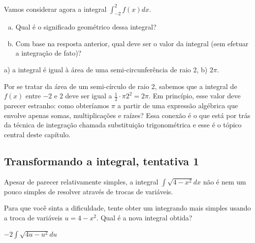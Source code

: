 \documentclass[main_estudante.tex]{subfiles}
\begin{document}

\begin{questao}
Vamos considerar agora a integral $\int_{-2}^{2} f(x)dx$.
\begin{enumerate}[a)]
\item Qual é o significado geométrico dessa integral?
\item Com base na resposta anterior, qual deve ser o valor da integral (sem efetuar a integração de fato)?
\end{enumerate}
\end{questao}

\begin{gabarito}
	\begin{gabaritoQuestao}
		a) a integral é igual à área de uma semi-circunferência de raio 2, b) $2\pi$.
	\end{gabaritoQuestao}
\end{gabarito}

Por se tratar da área de um semi-círculo de raio 2, sabemos que a integral de $f(x)$ entre $-2$ e $2$ deve ser igual a $\frac{1}{2} \cdot \pi 2^2 = 2\pi$. Em princípio, esse valor deve parecer estranho: como obteríamos $\pi$ a partir de uma expressão algébrica que envolve apenas somas, multiplicações e raízes? Essa conexão é o que está por trás da técnica de integração chamada substituição trigonométrica e esse é o tópico central deste capítulo.

\subsection*{Transformando a integral, tentativa 1}

Apesar de parecer relativamente simples, a integral $\int \sqrt{4-x^2}dx$ não é nem um pouco simples de resolver através de trocas de variáveis.


\begin{questao}
Para que você sinta a dificuldade, tente obter um integrando mais simples usando a troca de variáveis $u=4-x^2$. Qual é a nova integral obtida?
\end{questao}

\begin{gabarito}
	\begin{gabaritoQuestao}
		$-2\int\sqrt{4u-u^2}du$
	\end{gabaritoQuestao}
\end{gabarito}
\end{document}
